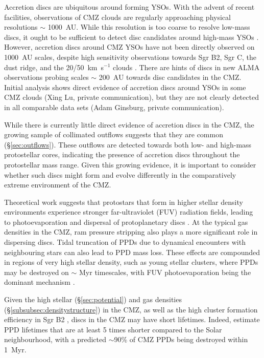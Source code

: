 Accretion discs are ubiquitous around forming YSOs. With the advent of recent facilities, observations of CMZ clouds are regularly approaching physical resolutions $\sim$ 1000~AU. While this resolution is too coarse to resolve low-mass discs, it ought to be sufficient to detect disc candidates around high-mass YSOs \citep[e.g.][]{Ahmadi2019}. However, accretion discs around CMZ YSOs have not been directly observed on 1000~AU scales, despite high sensitivity observations towards Sgr B2, Sgr C, the dust ridge, and the 20/50~km~s$^{-1}$ clouds \citep[e.g.][]{Schworer2019, Lu2021, Walker2021}. There are hints of discs in new ALMA observations probing scales $\sim$ 200~AU towards disc candidates in the CMZ. Initial analysis shows direct evidence of accretion discs around YSOs in some CMZ clouds (Xing Lu, private communication), but they are not clearly detected in all comparable data sets (Adam Ginsburg, private communication). 

While there is currently little direct evidence of accretion discs in the CMZ, the growing sample of collimated outflows suggests that they are common (\S \ref{sec:outflows}). These outflows are detected towards both low- and high-mass protostellar cores, indicating the presence of accretion discs throughout the protostellar mass range. Given this growing evidence, it is important to consider whether such discs might form and evolve differently in the comparatively extreme environment of the CMZ. 

Theoretical work suggests that protostars that form in higher stellar density environments experience stronger far-ultraviolet (FUV) radiation fields, leading to photoevaporation and dispersal of protoplanetary discs \citep[PPDs,][]{Winter2018, Winter2020}. At the typical gas densities in the CMZ, ram pressure stripping also plays a more significant role in dispersing discs.
Tidal truncation of PPDs due to dynamical encounters with neighbouring stars can also lead to PPD mass loss. These effects are compounded in regions of very high stellar density, such as young stellar clusters, where PPDs may be destroyed on $\sim$ Myr timescales, with FUV photoevaporation being the dominant mechanism \citep[e.g.][and references therein]{Winter2018}. 

Given the high stellar (\S \ref{sec:potential}) and gas densities (\S \ref{subsubsec:densitystructure}) in the CMZ, as well as the high cluster formation efficiency in Sgr B2 \citep{Ginsburg2018a}, discs in the CMZ may have short lifetimes.
Indeed, \citet{Winter2020} estimate PPD lifetimes that are at least 5 times shorter compared to the Solar neighbourhood, with a predicted $\sim$90\% of CMZ PPDs being destroyed within 1~Myr.


